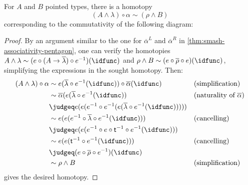 \documentclass{article}
\newcommand{\smsh}{\wedge}
\renewcommand{\o}{\ensuremath{\circ}}
\newcommand{\sy}{^{-1}}
\newcommand{\alphabar}{\overline{\alpha}}
\newcommand{\rhobar}{\overline{\rho}}
\newcommand{\lambdabar}{\overline{\lambda}}
\newcommand{\two}{\mathsf{t}}
\begin{document}
\begin{thm}\label{thm:smash-unitors-triangle}
	For $A$ and $B$ pointed types, there is a homotopy
	\[(A \smsh \lambda) \o \alpha \sim (\rho \smsh B)\]
	corresponding to the commutativity of the following diagram:
	\begin{center}
	\end{center}
\end{thm}
\begin{proof}
	By an argument similar to the one for $\alphabar^L$ and $\alphabar^R$ in \autoref{thm:smash-associativity-pentagon}, one can verify the homotopies $A \smsh \lambda \sim (e \o (A \to \lambdabar) \o e\sy)(\idfunc)$ and $\rho \smsh B \sim (e \o \rhobar \o e)(\idfunc)$, simplifying the expressions in the sought homotopy. Then:
	\begin{align*}
		(A \smsh \lambda) \o \alpha
		&\sim e(\lambdabar \o e\sy(\idfunc)) \o \alphabar(\idfunc) &&\text{(simplification)}\\
		&\sim \alphabar(e(\lambdabar \o e\sy(\idfunc)) &&\text{(naturality of $\alphabar$)}\\
		&\judgeq e(e(e\sy \o e\sy (e(\lambdabar \o e\sy(\idfunc)))))\\
		&\sim e(e(e\sy \o \lambdabar \o e\sy(\idfunc))) &&\text{(cancelling)}\\
		&\judgeq e(e(e\sy \o e \o \two\sy \o e\sy(\idfunc)))\\
		&\sim e(e(\two\sy \o e\sy(\idfunc))) &&\text{(cancelling)}\\
		&\judgeq (e \o \rhobar \o e\sy)(\idfunc)\\
		&\sim \rho \smsh B &&\text{(simplification)}
	\end{align*}
	gives the desired homotopy.
\end{proof}
\end{document}
